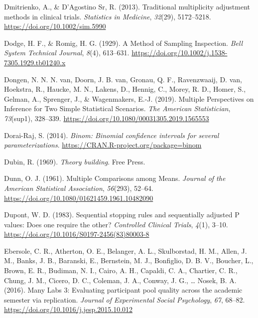 \documentclass[
  oneside]{krantz}
\newlength{\cslhangindent}
\newlength{\cslentryspacingunit} %
\newenvironment{CSLReferences}[2] %
 {%
  \setlength{\parindent}{0pt}
  \ifodd #1
  \let\oldpar\par
  \def\par{\hangindent=\cslhangindent\oldpar}
  \fi
  \setlength{\parskip}{#2\cslentryspacingunit}
 }%
 {}
\begin{document}
\begin{CSLReferences}{1}{0}
\leavevmode{}%
Dmitrienko, A., \& D'Agostino Sr, R. (2013). Traditional multiplicity
adjustment methods in clinical trials. \emph{Statistics in Medicine},
\emph{32}(29), 5172--5218. \url{https://doi.org/10.1002/sim.5990}

\leavevmode{}%
Dodge, H. F., \& Romig, H. G. (1929). A {Method} of {Sampling
Inspection}. \emph{Bell System Technical Journal}, \emph{8}(4),
613--631. \url{https://doi.org/10.1002/j.1538-7305.1929.tb01240.x}

\leavevmode{}%
Dongen, N. N. N. van, Doorn, J. B. van, Gronau, Q. F., Ravenzwaaij, D.
van, Hoekstra, R., Haucke, M. N., Lakens, D., Hennig, C., Morey, R. D.,
Homer, S., Gelman, A., Sprenger, J., \& Wagenmakers, E.-J. (2019).
Multiple {Perspectives} on {Inference} for {Two Simple Statistical
Scenarios}. \emph{The American Statistician}, \emph{73}(sup1), 328--339.
\url{https://doi.org/10.1080/00031305.2019.1565553}

\leavevmode{}%
Dorai-Raj, S. (2014). \emph{Binom: Binomial confidence intervals for
several parameterizations}.
\url{https://CRAN.R-project.org/package=binom}

\leavevmode{}%
Dubin, R. (1969). \emph{Theory building}. {Free Press}.

\leavevmode{}%
Dunn, O. J. (1961). Multiple {Comparisons} among {Means}. \emph{Journal
of the American Statistical Association}, \emph{56}(293), 52--64.
\url{https://doi.org/10.1080/01621459.1961.10482090}

\leavevmode{}%
Dupont, W. D. (1983). Sequential stopping rules and sequentially
adjusted {P} values: {Does} one require the other? \emph{Controlled
Clinical Trials}, \emph{4}(1), 3--10.
\url{https://doi.org/10.1016/S0197-2456(83)80003-8}

\leavevmode{}%
Ebersole, C. R., Atherton, O. E., Belanger, A. L., Skulborstad, H. M.,
Allen, J. M., Banks, J. B., Baranski, E., Bernstein, M. J., Bonfiglio,
D. B. V., Boucher, L., Brown, E. R., Budiman, N. I., Cairo, A. H.,
Capaldi, C. A., Chartier, C. R., Chung, J. M., Cicero, D. C., Coleman,
J. A., Conway, J. G., \ldots{} Nosek, B. A. (2016). Many {Labs} 3:
{Evaluating} participant pool quality across the academic semester via
replication. \emph{Journal of Experimental Social Psychology},
\emph{67}, 68--82. \url{https://doi.org/10.1016/j.jesp.2015.10.012}


\end{CSLReferences}
\end{document}
